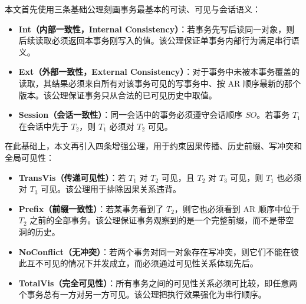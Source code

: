 本文首先使用三条基础公理刻画事务最基本的可读、可见与会话语义：
\begin{itemize}
    \item \textbf{Int（内部一致性，Internal Consistency）}：若事务先写后读同一对象，则后续读取必须返回本事务刚写入的值。该公理保证单事务内部行为满足串行语义。
    \item \textbf{Ext（外部一致性，External Consistency）}：对于事务中未被本事务覆盖的读取，其结果必须来自所有对该事务可见的写事务中、按 $\text{AR}$ 顺序最新的那个版本。该公理保证事务只从合法的已可见历史中取值。
    \item \textbf{Session（会话一致性）}：同一会话中的事务必须遵守会话顺序 $SO$。若事务 $T_1$ 在会话中先于 $T_2$，则 $T_1$ 必须对 $T_2$ 可见。
\end{itemize}

在此基础上，本文再引入四条增强公理，用于约束因果传播、历史前缀、写冲突和全局可见性：
\begin{itemize}
    \item \textbf{TransVis（传递可见性）}：若 $T_1$ 对 $T_2$ 可见，且 $T_2$ 对 $T_3$ 可见，则 $T_1$ 也必须对 $T_3$ 可见。该公理用于排除因果关系违背。
    \item \textbf{Prefix（前缀一致性）}：若某事务看到了 $T_2$，则它也必须看到 $\text{AR}$ 顺序中位于 $T_2$ 之前的全部事务。该公理保证事务观察到的是一个完整前缀，而不是带空洞的历史。
    \item \textbf{NoConflict（无冲突）}：若两个事务对同一对象存在写冲突，则它们不能在彼此互不可见的情况下并发成立，而必须通过可见性关系体现先后。
    \item \textbf{TotalVis（完全可见性）}：所有事务之间的可见性关系必须可比较，即任意两个事务总有一方对另一方可见。该公理把执行效果强化为串行顺序。
\end{itemize}

